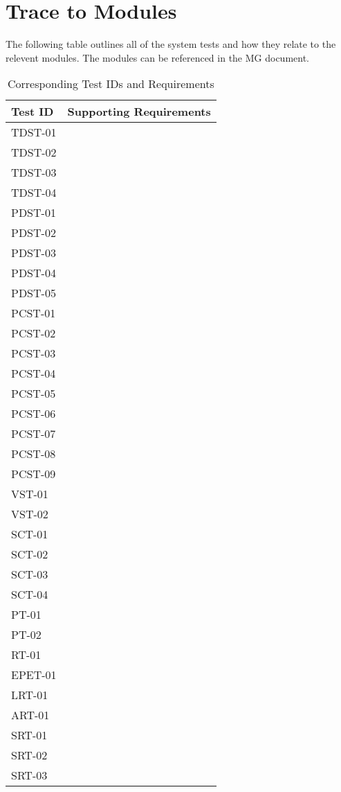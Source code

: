 \documentclass[12pt, titlepage]{article}
\begin{document}
\newpage

		
\section{Trace to Modules}	

The following table outlines all of the system tests and how they relate to the
relevent modules. The modules can be referenced in the MG document.\\

\begin{longtable}{ |p{4cm}|p{8cm}|  }
  \caption{Corresponding Test IDs and Requirements}
  \label{tab:Table1}\\
  
  \hline
  \textbf{Test ID} & \textbf{Supporting Requirements}\\
  \hline
  TDST-01 &  \\
  \hline
  TDST-02 &   \\
  \hline
  TDST-03 &   \\
  \hline
  TDST-04 &   \\
  \hline
  PDST-01 &   \\
  \hline
  PDST-02 &   \\
  \hline
  PDST-03 &   \\
  \hline
  PDST-04 &   \\
  \hline
  PDST-05 &  \\
  \hline
  PCST-01 &   \\
  \hline
  PCST-02 &  \\
  \hline
  PCST-03 &   \\
  \hline
  PCST-04 &   \\
  \hline
  PCST-05 &  \\
  \hline
  PCST-06 &   \\
  \hline
  PCST-07 &   \\
  \hline
  PCST-08 &   \\
  \hline
  PCST-09 &   \\
  \hline
  VST-01 &   \\
  \hline
  VST-02&   \\
  \hline
  SCT-01 &   \\
  \hline
  SCT-02 &   \\
  \hline
  SCT-03 &   \\
  \hline
  SCT-04 &   \\
  \hline
  PT-01 &  \\
  \hline
  PT-02 &  \\
  \hline
  RT-01 &  \\
  \hline
  EPET-01 &  \\
  \hline
  LRT-01&   \\
  \hline
  ART-01 &  \\
  \hline
  SRT-01 &  \\
  \hline
  SRT-02 &  \\
  \hline
  SRT-03 &  \\
  \hline
\end{longtable}
\end{document}
